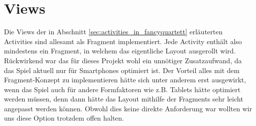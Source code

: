 \section{Views}
Die Views der in Abschnitt \ref{sec:activities_in_fancyquartett} erläuterten Activities sind allesamt als Fragment implementiert. Jede Activity enthält also mindestens ein Fragment, in welchem das eigentliche Layout ausgerollt wird. Rückwirkend war das für dieses Projekt wohl ein unnötiger Zusatzaufwand, da das Spiel aktuell nur für Smartphones optimiert ist. Der Vorteil alles mit dem Fragment-Konzept zu implementieren hätte sich unter anderem erst ausgewirkt, wenn das Spiel auch für andere Formfaktoren wie z.B. Tablets hätte optimiert werden müssen, denn dann hätte das Layout mithilfe der Fragments sehr leicht angepasst werden können. Obwohl dies keine direkte Anforderung war wollten wir uns diese Option trotzdem offen halten.




